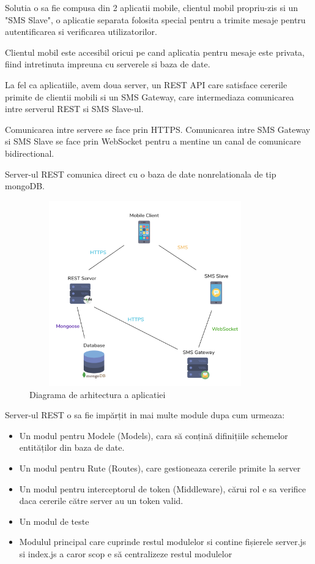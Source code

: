 \documentclass[12pt]{article}
\begin{document}
Solutia o sa fie compusa din 2 aplicatii mobile, clientul mobil propriu-zis
si un "SMS Slave", o aplicatie separata folosita special pentru a trimite mesaje
pentru autentificarea si verificarea utilizatorilor.

Clientul mobil este accesibil oricui pe cand aplicatia pentru mesaje este privata,
fiind intretinuta impreuna cu serverele si baza de date.

La fel ca aplicatiile, avem doua server, un REST API care satisface cererile primite
de clientii mobili si un SMS Gateway, care intermediaza comunicarea intre serverul REST
si SMS Slave-ul.

Comunicarea intre servere se face prin HTTPS.
Comunicarea intre SMS Gateway si SMS Slave se face prin WebSocket pentru a mentine
un canal de comunicare bidirectional.

Server-ul REST comunica direct cu o baza de date  nonrelationala de tip mongoDB.

\begin{figure}[H]
    \centering
    \includegraphics[width=10cm, height=8cm]{arhi.png}
    \caption{Diagrama de arhitectura a aplicatiei}
    \end{figure}

\newpage
Server-ul REST o sa fie impărțit in mai multe module dupa cum urmeaza:

\begin{itemize}
    \item Un modul pentru Modele (Models), cara să conțină difinițiile schemelor 
    entităților din baza de date.
    \item Un modul pentru Rute (Routes), care gestioneaza cererile primite la server
    \item Un modul pentru interceptorul de token (Middleware), cărui rol e sa
    verifice daca cererile către server au un token valid.
    \item Un modul de teste
    \item Modulul principal care cuprinde restul modulelor si contine fișierele server.js
    si index.js a caror scop e să centralizeze restul modulelor
\end{itemize}
\end{document}
